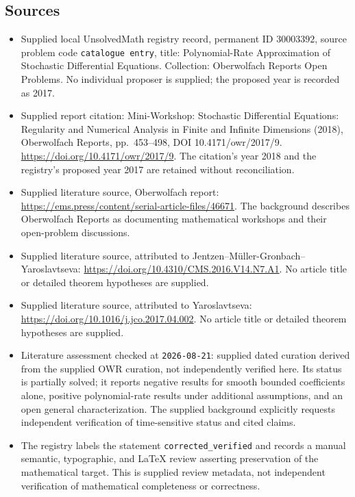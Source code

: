 \documentclass[11pt]{article}
\begin{document}
\subsection{Sources}
\begin{itemize}
\item Supplied local UnsolvedMath registry record, permanent ID $30003392$, source problem code \texttt{catalogue entry}, title: Polynomial-Rate Approximation of Stochastic Differential Equations. Collection: Oberwolfach Reports Open Problems. No individual proposer is supplied; the proposed year is recorded as 2017.
\item Supplied report citation: Mini-Workshop: Stochastic Differential Equations: Regularity and Numerical Analysis in Finite and Infinite Dimensions (2018), Oberwolfach Reports, pp.~453--498, DOI 10.4171/owr/2017/9. \url{https://doi.org/10.4171/owr/2017/9}. The citation's year 2018 and the registry's proposed year 2017 are retained without reconciliation.
\item Supplied literature source, Oberwolfach report: \url{https://ems.press/content/serial-article-files/46671}. The background describes Oberwolfach Reports as documenting mathematical workshops and their open-problem discussions.
\item Supplied literature source, attributed to Jentzen--M\"uller-Gronbach--Yaroslavtseva: \url{https://doi.org/10.4310/CMS.2016.V14.N7.A1}. No article title or detailed theorem hypotheses are supplied.
\item Supplied literature source, attributed to Yaroslavtseva: \url{https://doi.org/10.1016/j.jco.2017.04.002}. No article title or detailed theorem hypotheses are supplied.
\item Literature assessment checked at \texttt{2026-08-21}: supplied dated curation derived from the supplied OWR curation, not independently verified here. Its status is partially solved; it reports negative results for smooth bounded coefficients alone, positive polynomial-rate results under additional assumptions, and an open general characterization. The supplied background explicitly requests independent verification of time-sensitive status and cited claims.
\item The registry labels the statement \texttt{corrected\_verified} and records a manual semantic, typographic, and LaTeX review asserting preservation of the mathematical target. This is supplied review metadata, not independent verification of mathematical completeness or correctness.
\end{itemize}
\end{document}
